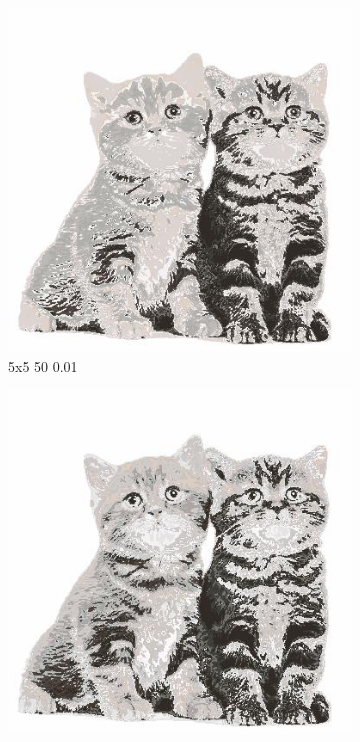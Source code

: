 \documentclass[12pt,a4paper]{article}
\begin{document}
\begin{figure}[htb]
\medskip
\begin{subfigure}{0.25\textwidth}
  \includegraphics[width=\linewidth]{images/big/5-5-50-001}
  \caption{5x5 50 0.01}
  \label{fig:4}
\end{subfigure}\hfil %
\begin{subfigure}{0.25\textwidth}
  \includegraphics[width=\linewidth]{images/big/5-5-255-05}

\end{subfigure}
\end{figure}
\end{document}
